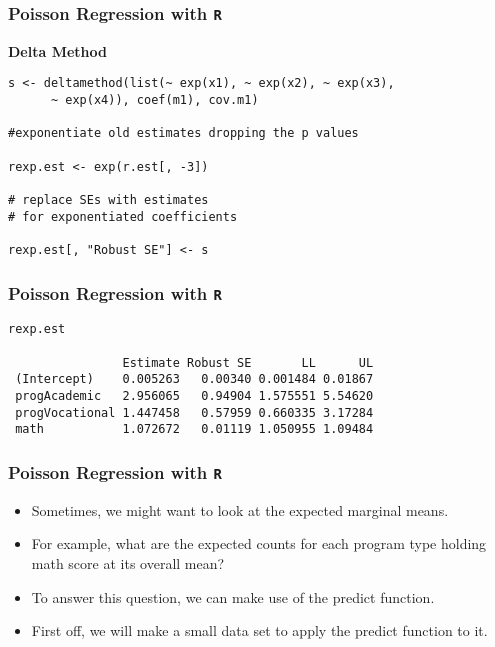 \documentclass[MASTER.tex]{subfiles}
\begin{document}
\begin{frame}[fragile]

\frametitle{Poisson Regression with \texttt{R}}
\textbf{Delta Method}

\begin{verbatim}
s <- deltamethod(list(~ exp(x1), ~ exp(x2), ~ exp(x3), 
      ~ exp(x4)), coef(m1), cov.m1)

#exponentiate old estimates dropping the p values

rexp.est <- exp(r.est[, -3])

# replace SEs with estimates 
# for exponentiated coefficients

rexp.est[, "Robust SE"] <- s

\end{verbatim}

\end{frame}

\begin{frame}[fragile]

\frametitle{Poisson Regression with \texttt{R}}

\begin{framed}
\begin{verbatim}
rexp.est
 
                Estimate Robust SE       LL      UL
 (Intercept)    0.005263   0.00340 0.001484 0.01867
 progAcademic   2.956065   0.94904 1.575551 5.54620
 progVocational 1.447458   0.57959 0.660335 3.17284
 math           1.072672   0.01119 1.050955 1.09484
\end{verbatim}
\end{framed}
\end{frame}


\begin{frame}[fragile]

\frametitle{Poisson Regression with \texttt{R}}
\Large
\begin{itemize}
\item Sometimes, we might want to look at the expected marginal means. 
\item For example, what are the expected counts for each program type holding math score at its overall mean? 
\item To answer this question, we can make use of the predict function. 
\item First off, we will make a small data set to apply the predict function to it.
\end{itemize}

\end{frame}
\end{document}
